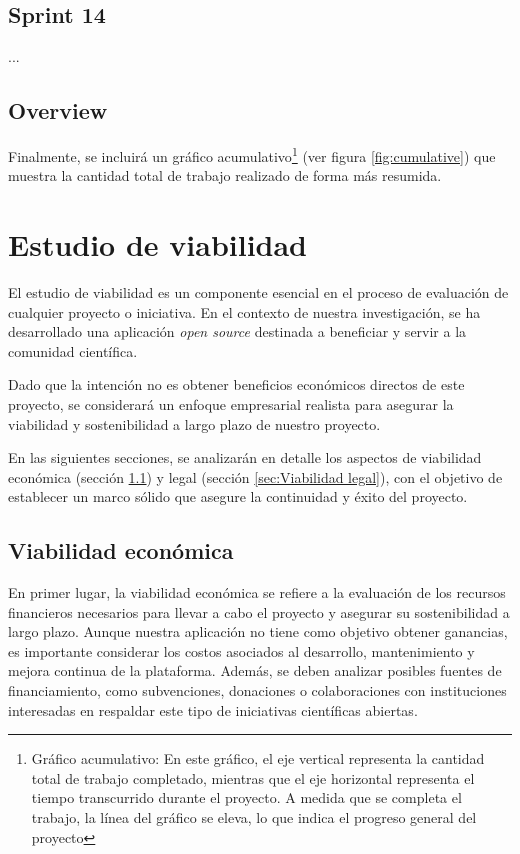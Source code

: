 
\subsection{Sprint 14}
...

\subsection{Overview}
Finalmente, se incluirá un gráfico acumulativo\footnote{Gráfico acumulativo: En este gráfico, el eje vertical representa la cantidad total de trabajo completado, mientras que el eje horizontal representa el tiempo transcurrido durante el proyecto. A medida que se completa el trabajo, la línea del gráfico se eleva, lo que indica el progreso general del proyecto} (ver figura \ref{fig:cumulative}) que muestra la cantidad total de trabajo realizado de forma más resumida.




\section{Estudio de viabilidad}
El estudio de viabilidad es un componente esencial en el proceso de evaluación de cualquier proyecto o iniciativa. En el contexto de nuestra investigación, se ha desarrollado una aplicación \textit{open source} destinada a beneficiar y servir a la comunidad científica. 

Dado que la intención no es obtener beneficios económicos directos de este proyecto, se considerará un enfoque empresarial realista para asegurar la viabilidad y sostenibilidad a largo plazo de nuestro proyecto.

En las siguientes secciones, se analizarán en detalle los aspectos de viabilidad económica (sección \ref{sec:Viabilidad económica}) y legal (sección \ref{sec:Viabilidad legal}), con el objetivo de establecer un marco sólido que asegure la continuidad y éxito del proyecto.

\subsection{Viabilidad económica}
\label{sec:Viabilidad económica}
En primer lugar, la viabilidad económica se refiere a la evaluación de los recursos financieros necesarios para llevar a cabo el proyecto y asegurar su sostenibilidad a largo plazo. Aunque nuestra aplicación no tiene como objetivo obtener ganancias, es importante considerar los costos asociados al desarrollo, mantenimiento y mejora continua de la plataforma. Además, se deben analizar posibles fuentes de financiamiento, como subvenciones, donaciones o colaboraciones con instituciones interesadas en respaldar este tipo de iniciativas científicas abiertas.

